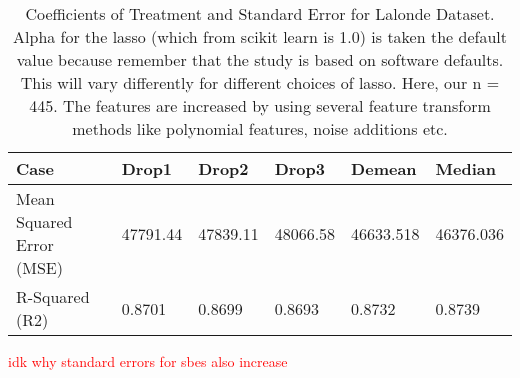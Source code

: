 \begin{table}[h!]
\renewcommand{\arraystretch}{1.5}
\centering
\begin{tabular}{||l l l l l l||} 
 \hline
 \hline
 Case & Drop1 & Drop2 & Drop3 & Demean & Median \\ [0.5ex] 
 \hline \hline
 Mean Squared Error (MSE) & 47791.44 & 47839.11 & 48066.58 & 46633.518 & 46376.036 \\ 
 R-Squared (R2) & 0.8701 & 0.8699 & 0.8693 & 0.8732 & 0.8739 \\
 \hline \hline
\end{tabular}
\caption{Coefficients of Treatment and Standard Error for Lalonde Dataset.  \\
Alpha for the lasso (which from scikit learn is 1.0) is taken the default value because remember that the study is based on software defaults. This will vary differently for different choices of lasso. Here, our n = 445. The features are increased by using several feature transform methods like polynomial features, noise additions etc.  }
\textcolor{red}{idk why standard errors for sbes also increase}
\label{table:1}
\end{table}



\begin{table}[h!]
\renewcommand{\arraystretch}{1.5}
\centering
\small
{}
\caption{Coefficients of Treatment and Standard Error for Lalonde Dataset.  \\
Alpha for the lasso (which from scikit learn is 1.0) is taken the default value because remember that the study is based on software defaults. This will vary differently for different choices of lasso. Here, our n = 445. The features are increased by using several feature transform methods like polynomial features, noise additions etc.  }
\label{table:1}
\end{table}

